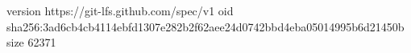 version https://git-lfs.github.com/spec/v1
oid sha256:3ad6cb4cb4114ebfd1307e282b2f62aee24d0742bbd4eba05014995b6d21450b
size 62371
